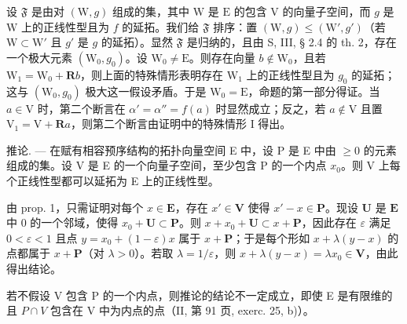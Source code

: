 设 \(\mathfrak{F}\) 是由对 \((\mathrm{W}, g)\) 组成的集，其中 \(\mathrm{W}\) 是 \(\mathrm{E}\) 的包含 \(\mathrm{V}\) 的向量子空间，而 \(g\) 是 \(\mathrm{W}\) 上的正线性型且为 \(f\) 的延拓。我们给 \(\mathfrak{F}\) 排序：置 \((\mathrm{W}, g) \leqslant (\mathrm{W}', g')\)（若 \(\mathrm{W} \subset \mathrm{W}'\) 且 \(g'\) 是 \(g\) 的延拓）。显然 \(\mathfrak{F}\) 是归纳的，且由 S, III, § 2.4 的 th. 2，存在一个极大元素 \((\mathrm{W}_0, g_0)\)。设 \(\mathrm{W}_0 \neq \mathrm{E}\)。则存在向量 \(b \notin \mathrm{W}_0\)，且若 \(\mathrm{W}_1 = \mathrm{W}_0 + \mathbf{R}b\)，则上面的特殊情形表明存在 \(\mathrm{W}_1\) 上的正线性型且为 \(g_0\) 的延拓；这与 \((\mathrm{W}_0, g_0)\) 极大这一假设矛盾。于是 \(\mathrm{W}_0 = \mathrm{E}\)，命题的第一部分得证。当 \(a \in \mathrm{V}\) 时，第二个断言在 \(\alpha' = \alpha'' = f(a)\) 时显然成立；反之，若 \(a \notin \mathrm{V}\) 且置 \(\mathrm{V}_1 = \mathrm{V} + \mathbf{R}a\)，则第二个断言由证明中的特殊情形 I 得出。

推论. --- 在赋有相容预序结构的拓扑向量空间 E 中，设 P 是 E 中由 \(\geqslant 0\) 的元素组成的集。设 V 是 E 的一个向量子空间，至少包含 P 的一个内点 \(x_{0}\)。则 V 上每个正线性型都可以延拓为 E 上的正线性型。

由 prop. 1，只需证明对每个 \(x \in \mathbf{E}\)，存在 \(x' \in \mathbf{V}\) 使得 \(x' - x \in \mathbf{P}\)。现设 \(\mathbf{U}\) 是 \(\mathbf{E}\) 中 0 的一个邻域，使得 \(x_0 + \mathbf{U} \subset \mathbf{P}\)。则 \(x + x_0 + \mathbf{U} \subset x + \mathbf{P}\)，因此存在 \(\varepsilon\) 满足 \(0 < \varepsilon < 1\) 且点 \(y = x_0 + (1 - \varepsilon)x\) 属于 \(x + \mathbf{P}\)；于是每个形如 \(x + \lambda(y - x)\) 的点都属于 \(x + \mathbf{P}\)（对 \(\lambda > 0\)）。若取 \(\lambda = 1 / \varepsilon\)，则 \(x + \lambda(y - x) = \lambda x_0 \in \mathbf{V}\)，由此得出结论。

若不假设 V 包含 P 的一个内点，则推论的结论不一定成立，即使 E 是有限维的且 \(P \cap V\) 包含在 V 中为内点的点（II, 第 91 页, exerc. 25, b)）。
\relax{}
